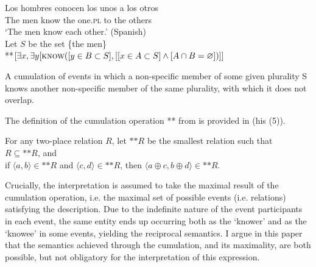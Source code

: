 \documentclass[output=paper,colorlinks,citecolor=brown]{langscibook}
\begin{document}
\ea\label{ex:arsenijevic:Hombres}
\ea
\gll Los hombres conocen los unos a los otros\\
The men know the one.\textsc{pl} to the others\\
\glt `The men know each other.' \hfill (Spanish)\\
\ex
Let $S$ be the set \{the men\}\\
**$[\exists x, \exists y [\textsc{know}([y \in B \subset S], [[x \in A \subset S] \wedge [A \cap B = \varnothing])]]$ 

A cumulation of events in which a non-specific member of some given plurality S knows another non-specific member of the same plurality, with which it does not overlap.
\z
\z

%
% 

\noindent The definition of the cumulation operation ** from \citet[][304]{s98} is provided in  (his (5)).

\ea\label{ex:arsenijevic:Sternefeld}
For any two-place relation $R$, let $\text{**}R$ be the smallest relation such that\\
 \ea $R \subseteq \text{**}R$, and\\
 \ex if $\langle a, b\rangle \in \text{**}R$ and $\langle c, d \rangle \in \text{**}R$, then $\langle a \oplus c, b \oplus d\rangle \in \text{**}R$. 
\z
\z

\noindent Crucially, the interpretation is assumed to take the maximal result of the cumulation operation, i.e. the maximal set of possible events (i.e. relations) satisfying the description. Due to the indefinite nature of the event participants in each event, the same entity ends up occurring both as the `knower' and as the `knowee' in some events, yielding the reciprocal semantics. I argue in this paper that the semantics achieved through the cumulation, and its maximality, are both possible, but not obligatory for the interpretation of this expression. 
\end{document}

